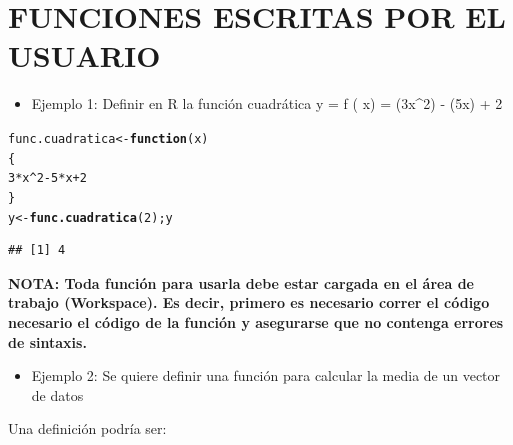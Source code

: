 \documentclass[12pt,letterpaper]{article}\usepackage[]{graphicx}\usepackage[]{color}
\makeatletter
\newcommand{\hlnum}[1]{\textcolor[rgb]{0.686,0.059,0.569}{#1}}%
\newcommand{\hlopt}[1]{\textcolor[rgb]{0,0,0}{#1}}%
\newcommand{\hlstd}[1]{\textcolor[rgb]{0.345,0.345,0.345}{#1}}%
\newcommand{\hlkwa}[1]{\textcolor[rgb]{0.161,0.373,0.58}{\textbf{#1}}}%
\newcommand{\hlkwb}[1]{\textcolor[rgb]{0.69,0.353,0.396}{#1}}%
\newcommand{\hlkwc}[1]{\textcolor[rgb]{0.333,0.667,0.333}{#1}}%
\newcommand{\hlkwd}[1]{\textcolor[rgb]{0.737,0.353,0.396}{\textbf{#1}}}%
\newenvironment{kframe}{%
 \def\at@end@of@kframe{}%
 \ifinner\ifhmode%
  \def\at@end@of@kframe{\end{minipage}}%
  \begin{minipage}{\columnwidth}%
 \fi\fi%
 \def\FrameCommand##1{\hskip\@totalleftmargin \hskip-\fboxsep
 \colorbox{shadecolor}{##1}\hskip-\fboxsep
     \hskip-\linewidth \hskip-\@totalleftmargin \hskip\columnwidth}%
 \MakeFramed {\advance\hsize-\width
   \@totalleftmargin\z@ \linewidth\hsize
   \@setminipage}}%
 {\par\unskip\endMakeFramed%
 \at@end@of@kframe}
\newenvironment{knitrout}{}{} %
\makeatother
\begin{document}
\section {FUNCIONES ESCRITAS POR EL USUARIO}
\begin {itemize}
\item Ejemplo 1: Definir en R la funci\'on cuadr\'atica y = f ( x) = (3x^2) - (5x) + 2
\end {itemize}
\begin{knitrout}
\color{fgcolor}\begin{kframe}
\begin{alltt}
\hlstd{func.cuadratica} \hlkwb{<-} \hlkwa{function}\hlstd{(}\hlkwc{x}\hlstd{)}
\hlstd{\{}
\hlnum{3}\hlopt{*}\hlstd{x}\hlopt{^}\hlnum{2}\hlopt{-}\hlnum{5}\hlopt{*}\hlstd{x}\hlopt{+}\hlnum{2}
\hlstd{\}}
\hlstd{y} \hlkwb{<-} \hlkwd{func.cuadratica}\hlstd{(}\hlnum{2}\hlstd{);y}
\end{alltt}
\begin{verbatim}
## [1] 4
\end{verbatim}
\end{kframe}
\end{knitrout}
\textbf{NOTA: Toda funci\'on para usarla debe estar cargada en el \'area de trabajo (Workspace). Es decir, primero es necesario correr el c\'odigo necesario el c\'odigo de la funci\'on y asegurarse que no contenga errores de sintaxis.}
\begin{itemize}
\item Ejemplo 2: Se quiere definir una funci\'on para calcular la media de un vector de datos
\end {itemize}
Una definici\'on podr\'ia ser:
\end{document}
